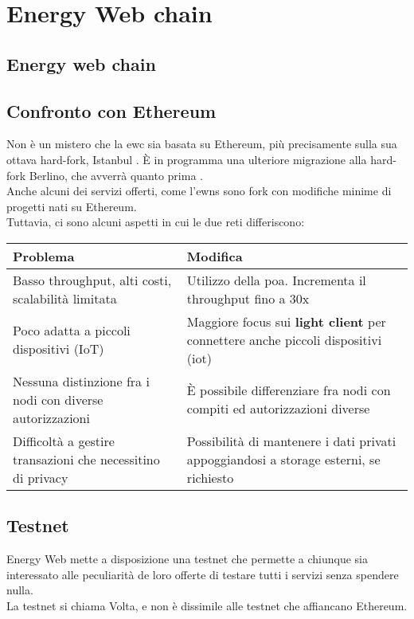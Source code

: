 \chapter{Energy Web chain}

\section{Energy web chain}

\section{Confronto con Ethereum}
Non è un mistero che la \gls{ewc} sia basata su Ethereum, più precisamente sulla sua ottava hard-fork, Istanbul \cite{wiki:ew-fork}. 
È in programma una ulteriore migrazione alla hard-fork Berlino, che avverrà quanto prima \cite{wiki:ew-berlino}. \\
Anche alcuni dei servizi offerti, come l'\gls{ewns} sono fork con modifiche minime di progetti nati su Ethereum. \\

Tuttavia, ci sono alcuni aspetti in cui le due reti differiscono:

\begin{tabular}{||p{7cm}|p{7cm}||}
    \hline
    Problema                                                    & Modifica                                                                                      \\
    \hline\hline
    Basso throughput, alti costi, scalabilità limitata          & Utilizzo della \gls{poa}. Incrementa il throughput fino a 30x                                 \\
    \hline
    Poco adatta a piccoli dispositivi (IoT)                     & Maggiore focus sui \textbf{light client} per connettere anche piccoli dispositivi (\gls{iot}) \\
    \hline
    Nessuna distinzione fra i nodi con diverse autorizzazioni   & È possibile differenziare fra nodi con compiti ed autorizzazioni diverse                      \\
    \hline
    Difficoltà a gestire transazioni che necessitino di privacy & Possibilità di mantenere i dati privati appoggiandosi a storage esterni, se richiesto         \\[1ex]
    \hline
\end{tabular}

\section{Testnet}
Energy Web mette a disposizione una testnet che permette a chiunque sia interessato alle peculiarità de loro offerte di testare tutti i servizi senza spendere nulla. \\
La testnet si chiama Volta, e non è dissimile alle testnet che affiancano Ethereum. \\

